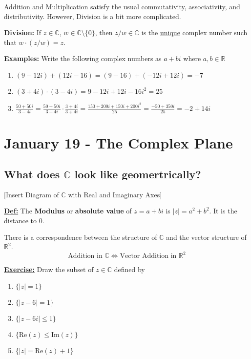\documentclass{article}
\newcommand{\R}{\mathbb{R}}
\newcommand{\C}{\mathbb{C}}
\newcommand{\defn}{\underline{\textbf{Def:}}}
\begin{document}
\vskip 0.5cm
Addition and Multiplication satisfy the usual commutativity, associativity, and distributivity. However, Division is a bit more complicated. 

\vskip 0.5cm
\textbf{\textbf{Division:}} If $z \in \mathbb{C}$, $w \in \mathbb{C} \setminus \{0\}$, then $z/w \in \mathbb{C}$ is the \underline{unique} complex number such that $w \cdot (z/w) = z$.

\vskip 0.5cm
\textbf{Examples:} Write the following complex numbers as $a + bi$ where $a, b \in \mathbb{R}$

\begin{enumerate}
  \item $(9-12i) + (12i - 16) = (9 - 16) + (-12i + 12i) = -7$ 
  \item $(3 + 4i) \cdot (3 - 4i) = 9 -12i + 12i - 16i^2 = 25$
  \item $\frac{50 + 50i}{3 - 4i} = \frac{50 + 50i}{3 - 4i} \cdot \frac{3 + 4i}{3 + 4i} = \frac{150 + 200i + 150i + 200i^2}{25}  = \frac{-50 + 350i}{25} = -2 + 14i$ 
\end{enumerate}

\pagebreak


\section{January 19 - The Complex Plane}

\vskip 0.5cm

\subsection{What does $\C$ look like geomertrically?}

[Insert Diagram of $\C$ with Real and Imaginary Axes]

\vskip 0.5cm
\defn\; The \textbf{Modulus} or \textbf{absolute value} of $z = a + bi$ is $|z| = a^2 + b^2$. It is the distance to $0$.

\vskip 0.5cm
There is a correspondence between the structure of $\C$ and the vector structure of $\R^2$.
\[ \text{Addition in $\C$} \iff \text{Vector Addition in $\R^2$} \]

\vskip 0.5cm
\underline{\textbf{Exercise:}} Draw the subset of $z \in \C$ defined by 
\begin{enumerate}
  \item $\{ |z| = 1 \}$
  \item $\{ |z - 6| = 1 \}$
  \item $\{ |z - 6i| \leq 1 \}$
  \item $\{ \text{Re}(z) \leq \text{Im}(z) \}$
  \item $\{ |z| = \text{Re}(z) + 1 \}$
\end{enumerate}
\end{document}
